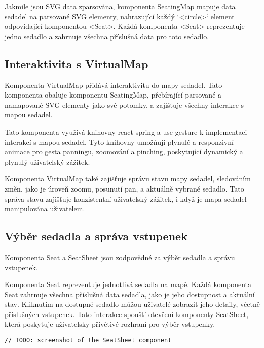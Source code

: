Jakmile jsou SVG data zparsována, komponenta SeatingMap mapuje data sedadel na parsované SVG elementy, nahrazující každý `<circle>` element odpovídající komponentou <Seat>.
Každá komponenta <Seat> reprezentuje jedno sedadlo a zahrnuje všechna příslušná data pro toto sedadlo.

\subsection{Interaktivita s VirtualMap}
\label{subsec:implementace-seating-virtualmap}
Komponenta VirtualMap přidává interaktivitu do mapy sedadel.
Tato komponenta obaluje komponentu SeatingMap, přebírající parsované a namapované SVG elementy jako své potomky, a zajišťuje všechny interakce s mapou sedadel.


Tato komponenta využívá knihovny react-spring a use-gesture k implementaci interakcí s mapou sedadel.
Tyto knihovny umožňují plynulé a responzivní animace pro gesta panningu, zoomování a pinching, poskytující dynamický a plynulý uživatelský zážitek.

Komponenta VirtualMap také zajišťuje správu stavu mapy sedadel, sledováním změn, jako je úroveň zoomu, posunutí pan, a aktuálně vybrané sedadlo.
Tato správa stavu zajišťuje konzistentní uživatelský zážitek, i když je mapa sedadel manipulována uživatelem.

\subsection{Výběr sedadla a správa vstupenek}
\label{subsec:implementace-seating-seat}
Komponenta Seat a SeatSheet jsou zodpovědné za výběr sedadla a správu vstupenek.

Komponenta Seat reprezentuje jednotlivá sedadla na mapě.
Každá komponenta Seat zahrnuje všechna příslušná data sedadla, jako je jeho dostupnost a aktuální stav.
Kliknutím na dostupné sedadlo můžou uživatelé zobrazit jeho detaily, včetně příslušných vstupenek.
Tato interakce spouští otevření komponenty SeatSheet, která poskytuje uživatelsky přívětivé rozhraní pro výběr vstupenky.

\begin{verbatim}
// TODO: screenshot of the SeatSheet component
\end{verbatim}

